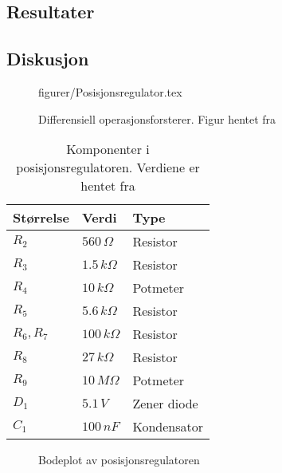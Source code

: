 \subsection{Resultater}







\subsection{Diskusjon}







\begin{figure} [h]
    \centering
     {figurer/Posisjonsregulator.tex}
    \caption{Differensiell operasjonsforsterer. Figur hentet fra \cite{AnalogMotorlabbOppgaver}}
    \label{fig:Posisjonsregulator}
\end{figure}

\begin{table}[h]
    \centering
    \caption{Komponenter i posisjonsregulatoren. Verdiene er hentet fra \cite{AnalogMotorlabbOppgaver}}
    \begin{tabular}{lll}
        \toprule
		Størrelse & Verdi & Type \\
		\midrule
        $R_2$ & $560\,\Omega$ & Resistor \\
        $R_3$ & $1.5\,k\Omega$ & Resistor\\
        $R_4$ & $10\,k\Omega$ & Potmeter\\
        $R_5$ & $5.6\,k\Omega$ & Resistor\\
        $R_6, R_7$ & $100\,k\Omega$ & Resistor\\
        $R_8$ & $27\,k\Omega$ & Resistor\\
        $R_9$ & $10\,M\Omega$ & Potmeter\\
        $D_1$ & $5.1\,V$ & Zener diode\\
        $C_1$ & $100\,nF$ & Kondensator\\
		\bottomrule
    \end{tabular}
    \label{tab:my_label}
\end{table}




\begin{figure}[h]
    \centering
    
    \caption{Bodeplot av posisjonsregulatoren}
    \label{fig:bodeplot}
\end{figure}


